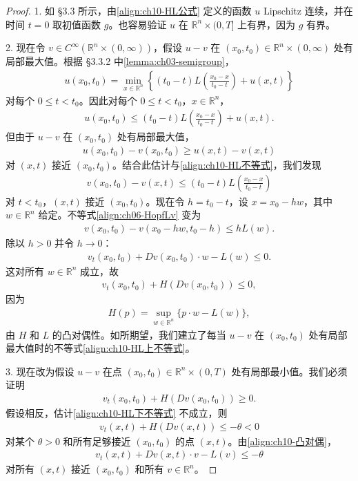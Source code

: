 \documentclass[../../main.tex]{subfiles}
\begin{document}
\begin{proof}
1. 如 \S3.3 所示，由\eqref{align:ch10-HL公式} 定义的函数 $u$ Lipschitz 连续，并在时间 $t=0$ 取初值函数 $g$。也容易验证 $u$ 在 $\mathbb{R}^n\times(0,T]$ 上有界，因为 $g$ 有界。

2. 现在令 $v\in C^\infty(\mathbb{R}^n\times(0,\infty))$，假设 $u-v$ 在 $(x_0,t_0)\in\mathbb{R}^n\times(0,\infty)$ 处有局部最大值。根据 \S3.3.2 中\cref{lemma:ch03-semigroup}，
\begin{align}
u(x_0,t_0)=\min_{x\in\mathbb{R}^n}\left\{(t_0-t)L\left(\frac{x_0-x}{t_0-t}\right)+u(x,t)\right\}
\label{align:ch10-HL半群性质}
\end{align}
对每个 $0\leqslant t<t_0$。因此对每个 $0\leqslant t<t_0$，$x\in\mathbb{R}^n$，
\begin{align}
u(x_0,t_0)\leqslant(t_0-t)L\left(\frac{x_0-x}{t_0-t}\right)+u(x,t).
\label{align:ch10-HL不等式}
\end{align}
但由于 $u-v$ 在 $(x_0,t_0)$ 处有局部最大值，
\begin{align*}
u(x_0,t_0)-v(x_0,t_0)\geqslant u(x,t)-v(x,t)
\end{align*}
对 $(x,t)$ 接近 $(x_0,t_0)$。结合此估计与\eqref{align:ch10-HL不等式}，我们发现
\begin{align}
v(x_0,t_0)-v(x,t)\leqslant(t_0-t)L\left(\frac{x_0-x}{t_0-t}\right)
\label{align:ch06-HopfLv}
\end{align}
对 $t<t_0$，$(x,t)$ 接近 $(x_0,t_0)$。现在令 $h=t_0-t$，设 $x=x_0-hw$，其中 $w\in\mathbb{R}^n$ 给定。不等式\eqref{align:ch06-HopfLv} 变为
\begin{align*}
v(x_0,t_0)-v(x_0-hw,t_0-h)\leqslant hL(w).
\end{align*}
除以 $h>0$ 并令 $h\to 0$：
\begin{align*}
v_t(x_0,t_0)+Dv(x_0,t_0)\cdot w-L(w)\leqslant 0.
\end{align*}
这对所有 $w\in\mathbb{R}^n$ 成立，故
\begin{align}
v_t(x_0,t_0)+H(Dv(x_0,t_0))\leqslant 0,
\label{align:ch10-HL上不等式}
\end{align}
因为
\begin{align}
H(p)=\sup_{w\in\mathbb{R}^n}\{p\cdot w-L(w)\},
\label{align:ch10-凸对偶}
\end{align}
由 $H$ 和 $L$ 的凸对偶性。如所期望，我们建立了每当 $u-v$ 在 $(x_0,t_0)$ 处有局部最大值时的不等式\eqref{align:ch10-HL上不等式}。

3. 现在改为假设 $u-v$ 在点 $(x_0,t_0)\in\mathbb{R}^n\times(0,T)$ 处有局部最小值。我们必须证明
\begin{align}
v_t(x_0,t_0)+H(Dv(x_0,t_0))\geqslant 0.
\label{align:ch10-HL下不等式}
\end{align}
假设相反，估计\eqref{align:ch10-HL下不等式} 不成立，则
\begin{align*}
v_t(x,t)+H(Dv(x,t))\leqslant-\theta<0
\end{align*}
对某个 $\theta>0$ 和所有足够接近 $(x_0,t_0)$ 的点 $(x,t)$。由\eqref{align:ch10-凸对偶}，
\begin{align}
v_t(x,t)+Dv(x,t)\cdot v-L(v)\leqslant-\theta
\label{align:ch10-HL矛盾}
\end{align}
对所有 $(x,t)$ 接近 $(x_0,t_0)$ 和所有 $v\in\mathbb{R}^n$。


\end{proof}
\end{document}
